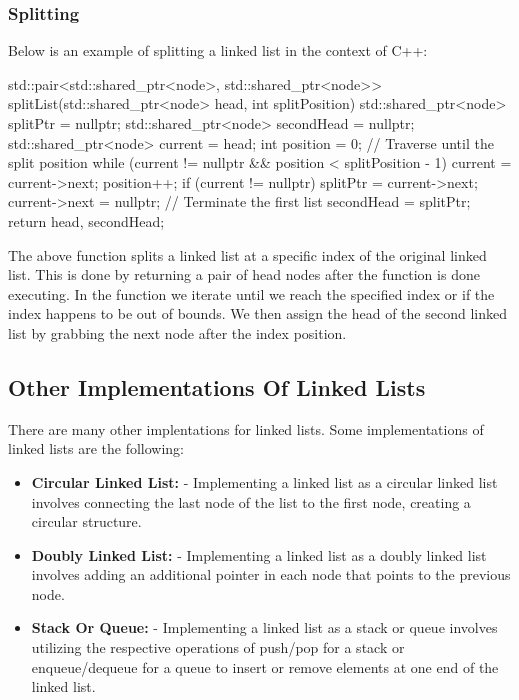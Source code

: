 \begin{highlight}

\subsubsection*{Splitting}

Below is an example of splitting a linked list in the context of C++:

\begin{code}
std::pair<std::shared_ptr<node>, std::shared_ptr<node>> 
        splitList(std::shared_ptr<node> head, int splitPosition) {
    std::shared_ptr<node> splitPtr = nullptr;
    std::shared_ptr<node> secondHead = nullptr;
    std::shared_ptr<node> current = head;
    int position = 0;
    // Traverse until the split position
    while (current != nullptr && position < splitPosition - 1) {
        current = current->next;
        position++;
    }
    if (current != nullptr) {
        splitPtr = current->next;
        current->next = nullptr;  // Terminate the first list
        secondHead = splitPtr;
    }
    return {head, secondHead};
}
\end{code}

The above function splits a linked list at a specific index of the original linked list. This is done by returning a pair of head nodes after the function is done executing. In the function we iterate
until we reach the specified index or if the index happens to be out of bounds. We then assign the head of the second linked list by grabbing the next node after the index position.

\end{highlight}

\subsection*{Other Implementations Of Linked Lists}

There are many other implentations for linked lists. Some implementations of linked lists are the following:

\begin{itemize}
    \item \textbf{Circular Linked List:} - Implementing a linked list as a circular linked list involves connecting the last node of the list to the first node, creating a circular structure.
    \item \textbf{Doubly Linked List:} - Implementing a linked list as a doubly linked list involves adding an additional pointer in each node that points to the previous node.
    \item \textbf{Stack Or Queue:} - Implementing a linked list as a stack or queue involves utilizing the respective operations of push/pop for a stack or enqueue/dequeue for a queue to 
    insert or remove elements at one end of the linked list.
\end{itemize}

